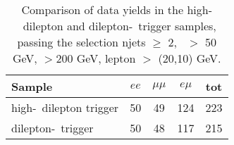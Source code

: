 \begin{table}[htb]
\begin{center}
\caption{\label{tab:yields4} Comparison of data yields in the high-\pt\ dilepton and dilepton-\Ht\ 
trigger samples, passing the selection njets $\geq$ 2, \met\ $>$ 50 GeV, \Ht$>$200 GeV,  lepton \pt $>$ (20,10) GeV.}
\begin{tabular}{l|cccc}
\hline
                    Sample   &           $ee$   &       $\mu\mu$   &         $e\mu$   &            tot  \\
\hline
high-\pt\ dilepton trigger   &             50   &             49   &            124   &            223  \\

dilepton-\Ht\ trigger        &             50   &             48   &            117   &            215  \\
\hline
\end{tabular}
\end{center}
\end{table}
